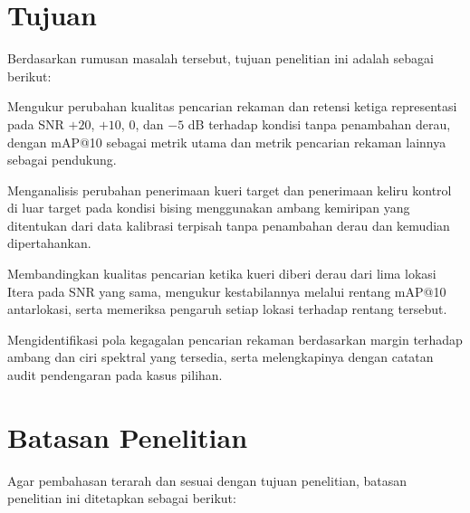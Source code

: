 \section{Tujuan}
Berdasarkan rumusan masalah tersebut, tujuan penelitian ini adalah sebagai berikut:

\begin{daftarBernomor}
    \setlength{\emergencystretch}{2em}
    \item Mengukur perubahan kualitas pencarian rekaman dan retensi ketiga representasi pada SNR $+20$, $+10$, $0$, dan $-5$ dB terhadap kondisi tanpa penambahan derau, dengan mAP@10 sebagai metrik utama dan metrik pencarian rekaman lainnya sebagai pendukung.

    \item Menganalisis perubahan penerimaan kueri target dan penerimaan keliru kontrol di luar target pada kondisi bising menggunakan ambang kemiripan yang ditentukan dari data kalibrasi terpisah tanpa penambahan derau dan kemudian dipertahankan.

    \item Membandingkan kualitas pencarian ketika kueri diberi derau dari lima lokasi Itera pada SNR yang sama, mengukur kestabilannya melalui rentang mAP@10 antarlokasi, serta memeriksa pengaruh setiap lokasi terhadap rentang tersebut.

    \item Mengidentifikasi pola kegagalan pencarian rekaman berdasarkan margin terhadap ambang dan ciri spektral yang tersedia, serta melengkapinya dengan catatan audit pendengaran pada kasus pilihan.
\end{daftarBernomor}

\section{Batasan Penelitian}

Agar pembahasan terarah dan sesuai dengan tujuan penelitian, batasan
penelitian ini ditetapkan sebagai berikut:

